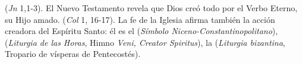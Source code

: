   (\emph{Jn} 1,1-3). El Nuevo Testamento revela que Dios creó todo por el Verbo Eterno, su Hijo amado.  (\emph{Col} 1, 16-17). La fe de la Iglesia afirma también la acción creadora del Espíritu Santo: él es el  (\emph{Símbolo Niceno-Constantinopolitano}),  (\emph{Liturgia de las Horas}, Himno \emph{Veni, Creator Spiritus}), la  (\emph{Liturgia bizantina}, Tropario de vísperas de Pentecostés).
